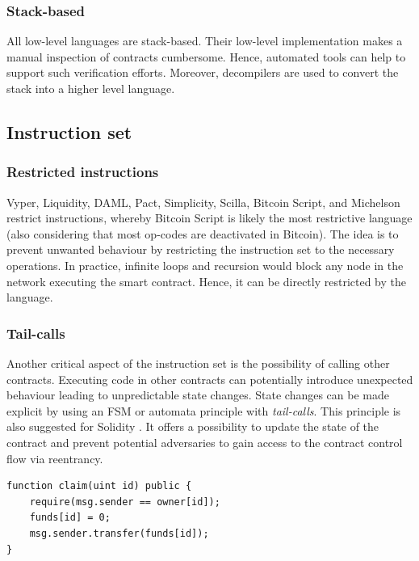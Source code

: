 \subsubsection{Stack-based}
All low-level languages are stack-based. Their low-level implementation makes a manual inspection of contracts cumbersome. Hence, automated tools can help to support such verification efforts. Moreover, decompilers are used to convert the stack into a higher level language.

\subsection{Instruction set}
\subsubsection{Restricted instructions}
Vyper, Liquidity, DAML, Pact, Simplicity, Scilla, Bitcoin Script, and Michelson restrict instructions, whereby Bitcoin Script is likely the most restrictive language (also considering that most op-codes are deactivated in Bitcoin). 
The idea is to prevent unwanted behaviour by restricting the instruction set to the necessary operations.
In practice, infinite loops and recursion would block any node in the network executing the smart contract. Hence, it can be directly restricted by the language.

\subsubsection{Tail-calls}
Another critical aspect of the instruction set is the possibility of calling other contracts. Executing code in other contracts can potentially introduce unexpected behaviour leading to unpredictable state changes. State changes can be made explicit by using an FSM or automata principle with \emph{tail-calls}. This principle is also suggested for Solidity \cite{ConsenSys2018Security}.
It offers a possibility to update the state of the contract and prevent potential adversaries to gain access to the contract control flow via reentrancy.

\begin{lstlisting}[caption={Tail calls implemented in Solidity.},label=lst:tail-call,language=Solidity]
function claim(uint id) public {
    require(msg.sender == owner[id]);
    funds[id] = 0;
    msg.sender.transfer(funds[id]);
}
\end{lstlisting}

